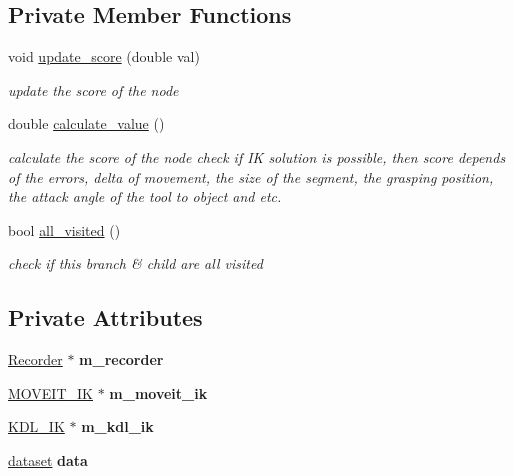 \subsection*{Private Member Functions}
\begin{DoxyCompactItemize}
\item 
void \hyperlink{classMCT__NODE2_a7e14b83901a94e54e3ef87aa012078de}{update\+\_\+score} (double val)
\begin{DoxyCompactList}\small\item\em update the score of the node \end{DoxyCompactList}\item 
double \hyperlink{classMCT__NODE2_a54908b7091bfc9ef49c06b2310d94408}{calculate\+\_\+value} ()
\begin{DoxyCompactList}\small\item\em calculate the score of the node check if IK solution is possible, then score depends of the errors, delta of movement, the size of the segment, the grasping position, the attack angle of the tool to object and etc. \end{DoxyCompactList}\item 
bool \hyperlink{classMCT__NODE2_a86c2a067b3865746d0a1b39142c0c536}{all\+\_\+visited} ()
\begin{DoxyCompactList}\small\item\em check if this branch \& child are all visited \end{DoxyCompactList}\end{DoxyCompactItemize}
\subsection*{Private Attributes}
\begin{DoxyCompactItemize}
\item 
\mbox{\label{classMCT__NODE2_a8938cf11d3628ac8275515d2d8e56f3e}} 
\hyperlink{classRecorder}{Recorder} $\ast$ {\bfseries m\+\_\+recorder}
\item 
\mbox{\label{classMCT__NODE2_acbda5193b6d56d41dadce675e6ca4874}} 
\hyperlink{classMOVEIT__IK}{M\+O\+V\+E\+I\+T\+\_\+\+IK} $\ast$ {\bfseries m\+\_\+moveit\+\_\+ik}
\item 
\mbox{\label{classMCT__NODE2_aeb643d23a87bf5a2ef8a0058f4188abc}} 
\hyperlink{classKDL__IK}{K\+D\+L\+\_\+\+IK} $\ast$ {\bfseries m\+\_\+kdl\+\_\+ik}
\item 
\mbox{\label{classMCT__NODE2_a01fce094b0953fbd4269a22d4d77a9c4}} 
\hyperlink{structdataset}{dataset} {\bfseries data}
\end{DoxyCompactItemize}



